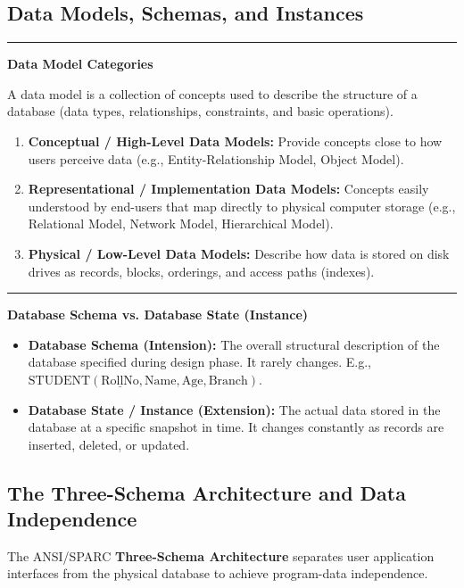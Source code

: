 \documentclass[11pt,a4paper]{article}
\newcommand{\concept}[1]{%
  \vspace{3pt}\noindent\textcolor{AnthGreen}{\rule{3.5pt}{10pt}}\enspace
  \textbf{\sffamily\color{AnthDark}#1}\par\vspace{2pt}%
}
\begin{document}
\subsection{Data Models, Schemas, and Instances}

\concept{Data Model Categories}
A data model is a collection of concepts used to describe the structure of a database (data types, relationships, constraints, and basic operations).
\begin{enumerate}
  \item \textbf{Conceptual / High-Level Data Models:} Provide concepts close to how users perceive data (e.g., Entity-Relationship Model, Object Model).
  \item \textbf{Representational / Implementation Data Models:} Concepts easily understood by end-users that map directly to physical computer storage (e.g., Relational Model, Network Model, Hierarchical Model).
  \item \textbf{Physical / Low-Level Data Models:} Describe how data is stored on disk drives as records, blocks, orderings, and access paths (indexes).
\end{enumerate}

\concept{Database Schema vs. Database State (Instance)}
\begin{itemize}
  \item \textbf{Database Schema (Intension):} The overall structural description of the database specified during design phase. It rarely changes. E.g., $\text{STUDENT}(\underline{\text{RollNo}}, \text{Name}, \text{Age}, \text{Branch})$.
  \item \textbf{Database State / Instance (Extension):} The actual data stored in the database at a specific snapshot in time. It changes constantly as records are inserted, deleted, or updated.
\end{itemize}

\subsection{The Three-Schema Architecture and Data Independence}

The ANSI/SPARC \textbf{Three-Schema Architecture} separates user application interfaces from the physical database to achieve program-data independence.
\end{document}
